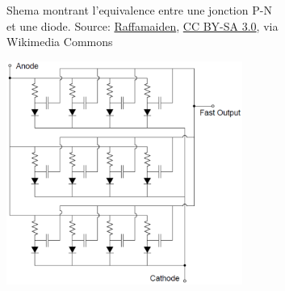 \begin{figure}
    \centering
    \begin{subfigure}{0.45\textwidth}
        \centering
        \captionsetup{width=.85\textwidth}
        \caption{Shema montrant l'equivalence entre une jonction P-N et une diode. Source: \href{https://commons.wikimedia.org/wiki/File:PN_diode_with_electrical_symbol.svg}{Raffamaiden}, \href{https://creativecommons.org/licenses/by-sa/3.0}{CC BY-SA 3.0}, via Wikimedia Commons}
        \label{fig_pn_diode}
    \end{subfigure}
    \begin{subfigure}{0.45\textwidth}
        \centering
        \includegraphics[width=0.85\textwidth]{img/she/SiPM_arithecture.png}

\end{subfigure}
\end{figure}
